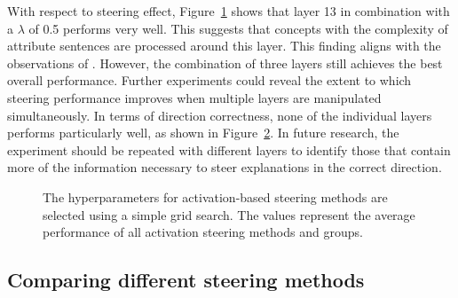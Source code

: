 With respect to steering effect, Figure~\ref{fig:activationSteeringHPO:steeringEffect} shows that layer \num{13} in combination with a \(\lambda\) of \num{0.5} performs very well. This suggests that concepts with the complexity of attribute sentences are processed around this layer. This finding aligns with the observations of \citet{konenStyleVectorsSteering2024,bogdanEmergentEffectsScaling2025}. However, the combination of three layers still achieves the best overall performance. Further experiments could reveal the extent to which steering performance improves when multiple layers are manipulated simultaneously. In terms of direction correctness, none of the individual layers performs particularly well, as shown in Figure~\ref{fig:activationSteeringHPO:directionCorrectness}. In future research, the experiment should be repeated with different layers to identify those that contain more of the information necessary to steer explanations in the correct direction.

\begin{figure}[ht]
  \begin{subfigure}[t]{0.49\linewidth}
    \label{fig:activationSteeringHPO:steeringEffect}
  \end{subfigure}
  \hfill
  \begin{subfigure}[t]{0.49\linewidth}
    \label{fig:activationSteeringHPO:directionCorrectness}
  \end{subfigure}
  \caption{The hyperparameters for activation-based steering methods are selected using a simple grid search. The values represent the average performance of all activation steering methods and groups.}%
  \label{fig:activationSteeringHPO}
\end{figure}


\subsection{Comparing different steering methods}
\label{sec:evaluation:steering:methods}

